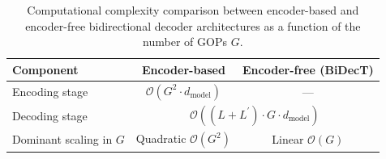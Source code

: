 \begin{table}[!t]
\caption{Computational complexity comparison between encoder-based and encoder-free bidirectional decoder architectures as a function of the number of GOPs $G$.}
\label{tab:tab01_complexity}
\centering
\begin{tabular}{l c c}
\hline\hline
\textbf{Component} & \textbf{Encoder-based} & \textbf{Encoder-free (BiDecT)} \\
\hline
Encoding stage & $\mathcal{O}(G^2 \cdot d_{\mathrm{model}})$ & --- \\
Decoding stage & \multicolumn{2}{c}{$\mathcal{O}((L+L^\prime) \cdot G \cdot d_{\mathrm{model}})$} \\
Dominant scaling in $G$ & Quadratic $\mathcal{O}(G^2)$ & Linear $\mathcal{O}(G)$ \\
\hline\hline
\end{tabular}
\end{table}


